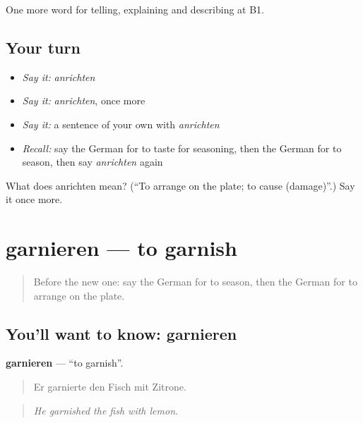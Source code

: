 \begin{grammarlens}[title={What you've built}]
One more word for telling, explaining and describing at B1.
\end{grammarlens}

\subsection*{Your turn}
\begin{itemize}
\raggedright
  \item \emph{Say it:} \emph{anrichten}
  \item \emph{Say it:} \emph{anrichten}, once more
  \item \emph{Say it:} a sentence of your own with \emph{anrichten}
  \item \emph{Recall:} say the German for to taste for seasoning, then the German for to season, then say \emph{anrichten} again
\end{itemize}

\begin{tcolorbox}[breakable,colback=teal!4,colframe=teal!35!black,title={Before you move on}]
What does anrichten mean? (\textquotedblleft{}To arrange on the plate; to cause (damage)\textquotedblright{}.) Say it once more.
\end{tcolorbox}
\section[garnieren]{garnieren — to garnish}

\label{lesson:GE-C329-garnieren}



\begin{quote}
Before the new one: say the German for to season, then the German for to arrange on the plate.
\end{quote}

\subsection*{You'll want to know: garnieren}
\textbf{garnieren} — \textquotedblleft{}to garnish\textquotedblright{}.

\begin{quote}
Er garnierte den Fisch mit Zitrone.
\end{quote}

\begin{quote}
\emph{He garnished the fish with lemon.}
\end{quote}

